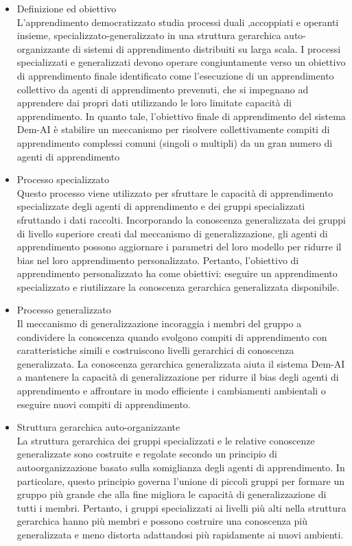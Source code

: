 \begin{itemize}
  \item Definizione ed obiettivo\\
  L'apprendimento democratizzato studia processi duali ,accoppiati e operanti insieme, specializzato-generalizzato in una struttura gerarchica auto-organizzante di sistemi di apprendimento distribuiti su larga scala. I processi specializzati e generalizzati devono operare congiuntamente verso un obiettivo di apprendimento finale identificato come l'esecuzione di un apprendimento collettivo da agenti di apprendimento prevenuti, che si impegnano ad apprendere dai propri dati utilizzando le loro limitate capacità di apprendimento. In quanto tale, l'obiettivo finale di apprendimento del sistema Dem-AI è stabilire un meccanismo per risolvere collettivamente compiti di apprendimento complessi comuni (singoli o multipli) da un gran numero di agenti di apprendimento
  \item Processo specializzato\\
  Questo processo viene utilizzato per sfruttare le capacità di apprendimento specializzate degli agenti di apprendimento e dei gruppi specializzati sfruttando i dati raccolti. Incorporando la conoscenza generalizzata dei gruppi di livello superiore creati dal meccanismo di generalizzazione, gli agenti di apprendimento possono aggiornare i parametri del loro modello per ridurre il bias nel loro apprendimento personalizzato.
Pertanto, l'obiettivo di apprendimento personalizzato ha come obiettivi: eseguire un apprendimento specializzato e riutilizzare la conoscenza gerarchica generalizzata disponibile.
  \item Processo generalizzato\\
  Il meccanismo di generalizzazione incoraggia i membri del gruppo a condividere la conoscenza quando svolgono compiti di apprendimento con caratteristiche simili e costruiscono livelli gerarchici di conoscenza generalizzata. La conoscenza gerarchica generalizzata aiuta il sistema Dem-AI a mantenere la capacità di generalizzazione per ridurre il bias degli agenti di apprendimento e affrontare in modo efficiente i cambiamenti ambientali o eseguire nuovi compiti di apprendimento.
  
  \item Struttura gerarchica auto-organizzante\\
  La struttura gerarchica dei gruppi specializzati e le relative conoscenze generalizzate sono costruite e regolate secondo un principio di autoorganizzazione basato sulla somiglianza degli agenti di apprendimento. In particolare, questo principio governa l'unione di piccoli gruppi per formare un gruppo più grande che alla fine migliora le capacità di generalizzazione di tutti i membri. Pertanto, i gruppi specializzati ai livelli più alti nella struttura gerarchica hanno più membri e possono costruire una conoscenza più generalizzata e meno distorta adattandosi più rapidamente ai nuovi ambienti.
  

\end{itemize}
